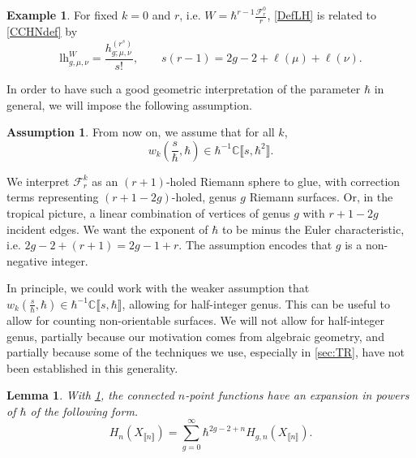 \documentclass[10pt,a4paper,oneside,no-math,reqno]{amsart}%
\theoremstyle{plain}
\newtheorem{lemma}[theorem]{Lemma}
\theoremstyle{definition}
\newtheorem{assumption}[theorem]{Assumption}
\newtheorem{example}[theorem]{Example}
\theoremstyle{remark}
\numberwithin{equation}{section}
\newcommand{\mb}[1]{\mathbb{#1}}
\newcommand{\mc}[1]{\mathcal{#1}}
\newcommand{\1}{\mathds{1}}
\newcommand{\C}{\mb{C}}
\newcommand{\<}{\langle}
\renewcommand{\>}{\rangle}
\newcommand{\lh}{\mathord{\mathrm{l\!h}}}
\begin{document}
\begin{example}\label{CCexample}
    For fixed $k = 0$ and $r$, i.e. $W = \hbar^{r-1}\frac{\mc{F}_r^0}{r}$, \cref{DefLH} is related to \cref{CCHNdef} by
    \begin{equation}
        \lh^W_{g,\mu,\nu}
        =
        \frac{h^{(r^s)}_{g;\mu, \nu}}{s!}, \qquad s(r-1)=2g-2+\ell(\mu)+\ell(\nu)  .
    \end{equation}
\end{example}

In order to have such a good geometric interpretation of the parameter $ \hbar$ in general, we will impose the following assumption.

\begin{assumption}\label{TopologicalAssumption}
    From now on, we assume that for all $ k$,
	\begin{equation}
		w_k (\frac{s}{\hbar}, \hbar) \in \hbar^{-1} \C \llbracket s , \hbar^2 \rrbracket .
	\end{equation}
\end{assumption}

We interpret $ \mc{F}_r^k$ as an $(r+1)$-holed Riemann sphere to glue, with correction terms representing $ (r+1-2g)$-holed, genus $g$ Riemann surfaces.
Or, in the tropical picture, a linear combination of vertices of genus $g$ with $ r+1-2g$ incident edges. We want the exponent of $ \hbar$ to be minus the Euler characteristic, i.e. $ 2g -2 + (r+1) = 2g-1+r$. The assumption encodes that $ g$ is a non-negative integer.\par
In principle, we could work with the weaker assumption that $ w_k (\frac{s}{\hbar}, \hbar ) \in \hbar^{-1} \C \llbracket s, \hbar \rrbracket$, allowing for half-integer genus. This can be useful to allow for counting non-orientable surfaces. We will not allow for half-integer genus, partially because our motivation comes from algebraic geometry, and partially because some of the techniques we use, especially in \cref{sec:TR}, have not been established in this generality.

\begin{lemma}
    With \cref{TopologicalAssumption}, the connected $n$-point functions have an expansion in powers of $ \hbar$ of the following form.
    \begin{equation}
        H_n (X_{\llbracket n \rrbracket})
        =
        \sum_{g = 0}^\infty \hbar^{2g-2+n} H_{g,n} ( X_{\llbracket n \rrbracket} ).
    \end{equation}
\end{lemma}
\end{document}
